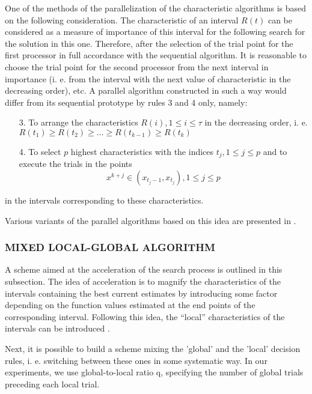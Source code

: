\documentclass{aip-cp}
\begin{document}
One of the methods of the parallelization of the characteristic algorithms is based on the following consideration. The characteristic of an interval $R(t)$ can be considered as a measure of importance of this interval for the following search for the solution in this one. Therefore, after the selection of the trial point for the first processor in full accordance with the sequential algorithm. It is reasonable to choose the trial point for the second processor from the next interval in importance (i. e. from the interval with the next value of characteristic in the decreasing order), etc. A parallel algorithm constructed in such a way would differ from its sequential prototype by rules 3 and 4 only, namely:
\begin{enumerate}
\item[3.] To arrange the characteristics $R(i),1\leqslant i\leqslant \tau$  in the decreasing order, i. e. $R(t_1)\geqslant R(t_2)\geqslant \dots \geqslant R(t_{k-1}) \geqslant R(t_k)$
\item[4.] To select $p$ highest characteristics with the indices $t_j,1\leqslant j \leqslant p$ and to execute the trials in the points
\begin{displaymath}
x^{k+j} \in (x_{t_j - 1}, x_{t_j}),1\leqslant j \leqslant p
\end{displaymath}
\end{enumerate}

in the intervals corresponding to these characteristics.

Various variants of the parallel algorithms based on this idea are presented in \citep{parAlg,parAlg2,gergelLNCS,gergelStrParComputing,mixedAlgLNCS,barkXeon}.

\subsubsection{MIXED LOCAL-GLOBAL ALGORITHM}
A scheme aimed at the acceleration of the search process is outlined in this subsection. The idea of acceleration is to magnify the characteristics of the intervals containing the best current estimates by introducing some factor depending on the function values estimated at the end points of the corresponding interval. Following this idea, the “local” characteristics of the intervals can be introduced \citep{strongSerg,indexMethod}.

Next, it is possible to build a scheme mixing the 'global' and the 'local' decision rules, i. e. switching between these ones in some systematic way. In our experiments, we use global-to-local ratio q, specifying the number of global trials preceding each local trial.
\end{document}
